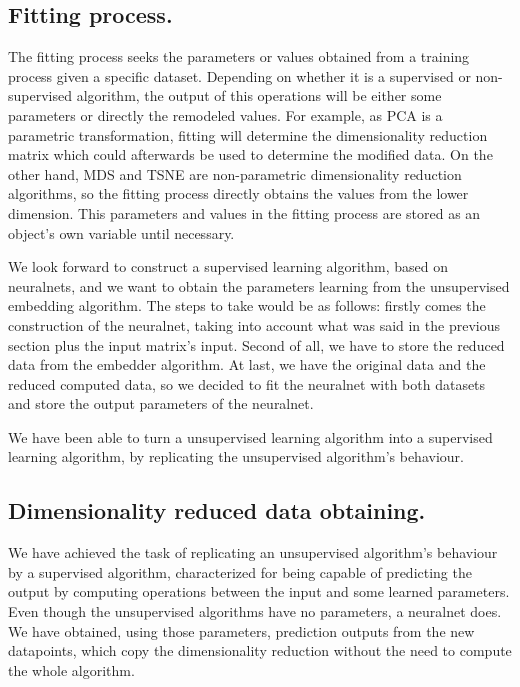 \documentclass[a4paper,11pt,spanish]{report}
\begin{document}
\subsection{Fitting process.}
\label{ssec:fit}

The fitting process seeks the parameters or values obtained from a training process given a specific dataset. Depending on whether it is a supervised or non-supervised algorithm, the output of this operations will be either some parameters or directly the remodeled values. For example, as PCA is a parametric transformation, fitting will determine the dimensionality reduction matrix which could afterwards be used to determine the modified data. On the other hand, MDS and TSNE are non-parametric dimensionality reduction algorithms, so the fitting process directly obtains the values from the lower dimension. This parameters and values in the fitting process are stored as an object's own variable until necessary.

We look forward to construct a supervised learning algorithm, based on neuralnets, and we want to obtain the parameters learning from the unsupervised embedding algorithm. The steps to take would be as follows: firstly comes the construction of the neuralnet, taking into account what was said in the previous section plus the input matrix's input. Second of all, we have to store the reduced data from the embedder algorithm. At last, we have the original data and the reduced computed data, so we decided to fit the neuralnet with both datasets and store the output parameters of the neuralnet.
\vspace{10pt}


We have been able to turn a unsupervised learning algorithm into a supervised learning algorithm, by replicating the unsupervised algorithm's behaviour.

\subsection{Dimensionality reduced data obtaining.}
\label{ssec:trans}

We have achieved the task of replicating an unsupervised algorithm's behaviour by a supervised algorithm, characterized for being capable of predicting the output by computing operations between the input and some learned parameters.
Even though the unsupervised algorithms have no parameters, a neuralnet does. We have obtained, using those parameters, prediction outputs from the new datapoints, which copy the dimensionality reduction without the need to compute the whole algorithm.
\end{document}
